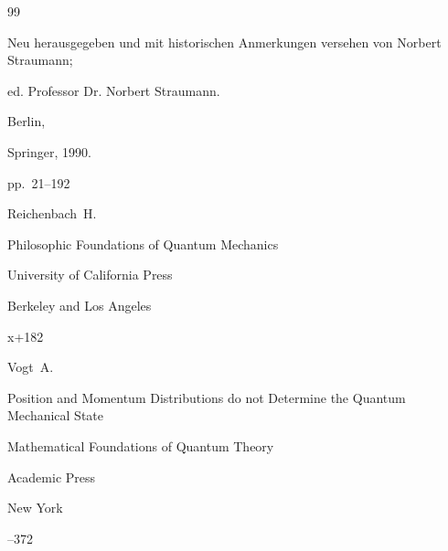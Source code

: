 \begin{thebibliography}{99}

 Neu herausgegeben und mit historischen Anmerkungen versehen von Norbert Straumann;

ed. Professor Dr. Norbert Straumann.

Berlin,

Springer, 1990.

 pp.~21--192


















\by  Reichenbach~H.

\book Philosophic Foundations of Quantum Mechanics


\publ University of California Press

\publaddr Berkeley and Los Angeles 

\totalpages x+182




\by Vogt~A.

\paper Position and Momentum Distributions do not Determine the Quantum Mechanical State

\inbook Mathematical Foundations of Quantum Theory


\publ Academic Press

\publaddr New York

--372







\end{thebibliography}
